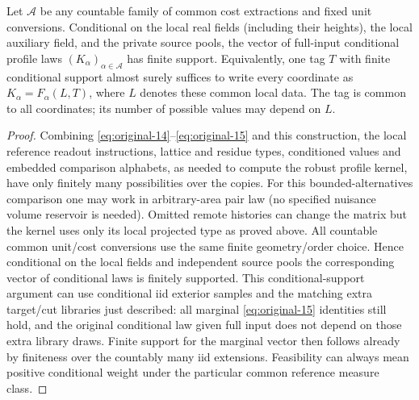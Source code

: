 \begin{theorem}\label{kern:finite-vector}
Let \(\mathcal A\) be any countable family of common cost extractions and fixed unit conversions.
Conditional on the local real fields (including their heights), the local auxiliary field, and
the private source pools, the vector of full-input conditional profile laws
\((K_\alpha)_{\alpha\in\mathcal A}\) has finite support. Equivalently, one tag \(T\) with finite conditional support almost surely suffices to write every coordinate as \(K_\alpha=F_\alpha(L,T)\), where
\(L\) denotes these common local data. The tag is common to all coordinates; its number of
possible values may depend on \(L\).
\end{theorem}
\begin{proof}

Combining \eqref{eq:original-14}–\eqref{eq:original-15} and this construction, the local reference readout
instructions, lattice and residue types, conditioned values and embedded comparison alphabets, as needed to
compute the robust profile kernel, have only finitely many possibilities over the copies. For this
bounded-alternatives comparison one may work in arbitrary-area pair law (no specified nuisance volume
reservoir is needed). Omitted remote histories can change the matrix but the kernel uses only its local
projected type as proved above. All countable common unit/cost conversions use the same finite
geometry/order choice. Hence conditional on the local fields and independent source pools the corresponding
vector of conditional laws is finitely supported. This conditional-support argument can use conditional iid
exterior samples and the matching extra target/cut libraries just described: all marginal
\eqref{eq:original-15} identities still hold, and the original conditional law given full input does not
depend on those extra library draws. Finite support for the marginal vector then follows already by
finiteness over the countably many iid extensions. Feasibility can always mean positive conditional weight
under the particular common reference measure class.


\end{proof}
